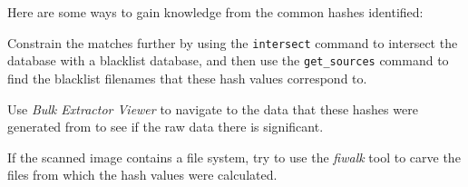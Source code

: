 \documentclass[12pt,twoside]{article}
\newcommand{\bev}{\emph{Bulk Extractor Viewer}\xspace}
\newcommand{\fiwalk}{\emph{fiwalk}\xspace}
\begin{document}
Here are some ways to gain knowledge from the common hashes identified:
\begin{compactitem}
\item Constrain the matches further by using the \texttt{intersect} command
to intersect the database with a blacklist database,
and then use the \texttt{get\_sources} command
to find the blacklist filenames that these hash values correspond to.
\item Use \bev to navigate to the data that these hashes were generated from
to see if the raw data there is significant.
\item If the scanned image contains a file system,
try to use the \fiwalk tool to carve the files from which the hash values
were calculated.
\end{compactitem}
\end{document}

